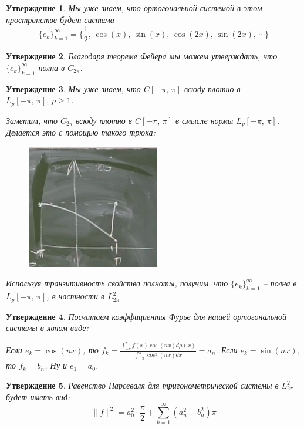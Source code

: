 \documentclass[a4paper,12pt]{article}
\renewcommand{\geq}{\ensuremath{\geqslant}}
\theoremstyle{plain}
\newtheorem{proposition}{Утверждение}[section]
\theoremstyle{definition}
\theoremstyle{remark}
\begin{document}
\begin{proposition}
	Мы уже знаем, что ортогональной системой в этом пространстве будет система
	\[\{e_k\}_{k = 1}^\infty = \{\frac{1}{2},\, \cos(x),\,\sin(x),\,\cos(2x),\,\sin(2x),\,\cdots\}\]
\end{proposition}

\begin{proposition}
	Благодаря теореме Фейера мы можем утверждать, что $\{e_k\}_{k = 1}^\infty$ полна в $C_{2\pi}$.
\end{proposition}

\begin{proposition}
	Мы уже знаем, что $C[-\pi,\, \pi]$ всюду плотно в $L_p[-\pi,\,\pi],\, p \geq 1$.

	Заметим, что $C_{2\pi}$ всюду плотно в $C[-\pi,\,\pi]$ в смысле нормы $L_p[-\pi,\,\pi]$. Делается это с помощью такого трюка:
	\begin{figure}[h]
		\includegraphics[scale=0.5]{img/periodic_to_C.png}
	\end{figure}

	Используя транзитивность свойства полноты, получим, что $\{e_k\}_{k = 1}^\infty$ -- полна в $L_p[-\pi,\,\pi]$, в частности в $L_{2\pi}^2$.
\end{proposition}

\begin{proposition}
	Посчитаем коэффициенты Фурье для нашей ортогональной системы в явном виде:

	Если $e_k = \cos(nx)$, то $f_k = \frac{\int_{-\pi}^\pi f(x)\cos(nx)d\mu(x)}{\int_{-\pi}^\pi \cos^2(nx)dx} = a_n$.
	Если $e_k = \sin(nx)$, то $f_k = b_n$.
	Ну и $e_1 = a_0$.
\end{proposition}

\begin{proposition}
	Равенство Парсеваля для тригонометрической системы в $L^2_{2\pi}$ будет иметь вид:
	\[\|f\|^2 = a_0^2\cdot\frac{\pi}{2} + \sum_{k = 1}^\infty (a_n^2 + b_n^2)\pi\]
\end{proposition}
\end{document}
